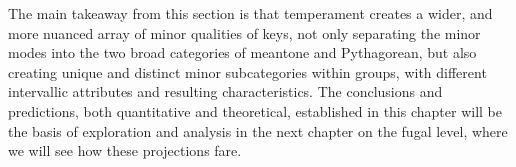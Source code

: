 The main takeaway from this section is that temperament creates a wider,
and more nuanced array of minor qualities of keys, not only separating
the minor modes into the two broad categories of meantone and
Pythagorean, but also creating unique and distinct minor subcategories
within groups, with different intervallic attributes and resulting
characteristics. The conclusions and predictions, both quantitative and
theoretical, established in this chapter will be the basis of
exploration and analysis in the next chapter on the fugal level, where
we will see how these projections fare.


    
    
    
